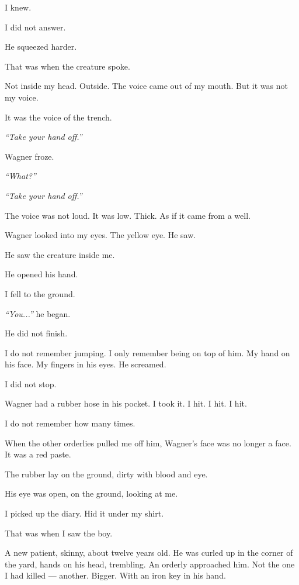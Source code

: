 \noindent I knew.

\noindent I did not answer.

\noindent He squeezed harder.

\noindent That was when the creature spoke.

\noindent Not inside my head. Outside. The voice came out of my mouth. But it was not my voice.

\noindent It was the voice of the trench.

\noindent \textit{\textquotedblleft{}Take your hand off.\textquotedblright{}}

\noindent Wagner froze.

\noindent \textit{\textquotedblleft{}What?\textquotedblright{}}

\noindent \textit{\textquotedblleft{}Take your hand off.\textquotedblright{}}

\noindent The voice was not loud. It was low. Thick. As if it came from a well.

\noindent Wagner looked into my eyes. The yellow eye. He saw.

\noindent He saw the creature inside me.

\noindent He opened his hand.

\noindent I fell to the ground.

\noindent \textit{\textquotedblleft{}You...\textquotedblright{}} he began.

\noindent He did not finish.

\noindent I do not remember jumping. I only remember being on top of him. My hand on his face. My fingers in his eyes. He screamed.

\noindent I did not stop.

\noindent Wagner had a rubber hose in his pocket. I took it. I hit. I hit. I hit.

\noindent I do not remember how many times.

\noindent When the other orderlies pulled me off him, Wagner's face was no longer a face. It was a red paste.

\noindent The rubber lay on the ground, dirty with blood and eye.

\noindent His eye was open, on the ground, looking at me.

\noindent I picked up the diary. Hid it under my shirt.

\noindent That was when I saw the boy.

\noindent A new patient, skinny, about twelve years old. He was curled up in the corner of the yard, hands on his head, trembling. An orderly approached him. Not the one I had killed --- another. Bigger. With an iron key in his hand.

